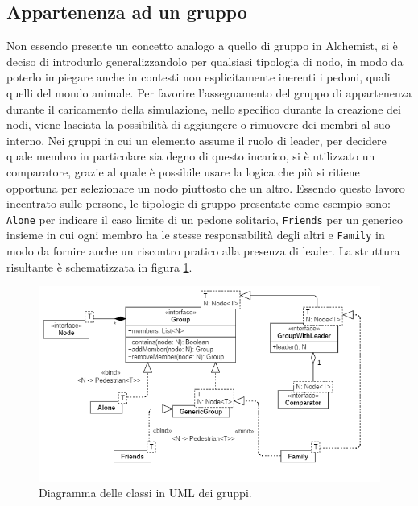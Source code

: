 \subsection{Appartenenza ad un gruppo}
Non essendo presente un concetto analogo a quello di gruppo in Alchemist, si è deciso di introdurlo generalizzandolo per qualsiasi tipologia di nodo, in modo da poterlo impiegare anche in contesti non esplicitamente inerenti i pedoni, quali quelli del mondo animale. \newline
Per favorire l'assegnamento del gruppo di appartenenza durante il caricamento della simulazione, nello specifico durante la creazione dei nodi, viene lasciata la possibilità di aggiungere o rimuovere dei membri al suo interno. \newline
Nei gruppi in cui un elemento assume il ruolo di leader, per decidere quale membro in particolare sia degno di questo incarico, si è utilizzato un comparatore, grazie al quale è possibile usare la logica che più si ritiene opportuna per selezionare un nodo piuttosto che un altro. \newline 
Essendo questo lavoro incentrato sulle persone, le tipologie di gruppo presentate come esempio sono: \texttt{Alone} per indicare il caso limite di un pedone solitario, \texttt{Friends} per un generico insieme in cui ogni membro ha le stesse responsabilità degli altri e \texttt{Family} in modo da fornire anche un riscontro pratico alla presenza di leader. \newline
La struttura risultante è schematizzata in figura \ref{fig:groups-uml}.

\begin{figure}[ht]
  \centering
  \includegraphics[width=0.75\linewidth]{immagini/uml/groups.png}
  \caption{Diagramma delle classi in UML dei gruppi.}
  \label{fig:groups-uml}
\end{figure}